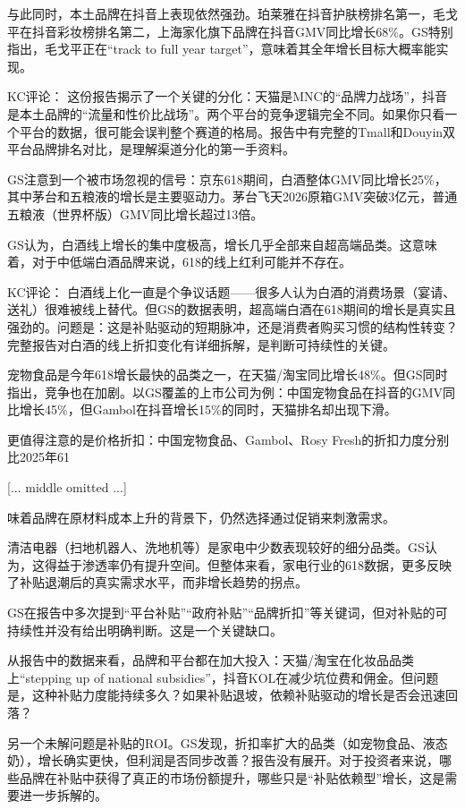 \documentclass[11pt]{ctexart}
\begin{document}
与此同时，本土品牌在抖音上表现依然强劲。珀莱雅在抖音护肤榜排名第一，毛戈平在抖音彩妆榜排名第二，上海家化旗下品牌在抖音GMV同比增长68\%。GS特别指出，毛戈平正在“track to full year target”，意味着其全年增长目标大概率能实现。

KC评论： 这份报告揭示了一个关键的分化：天猫是MNC的“品牌力战场”，抖音是本土品牌的“流量和性价比战场”。两个平台的竞争逻辑完全不同。如果你只看一个平台的数据，很可能会误判整个赛道的格局。报告中有完整的Tmall和Douyin双平台品牌排名对比，是理解渠道分化的第一手资料。

GS注意到一个被市场忽视的信号：京东618期间，白酒整体GMV同比增长25\%，其中茅台和五粮液的增长是主要驱动力。茅台飞天2026原箱GMV突破3亿元，普通五粮液（世界杯版）GMV同比增长超过13倍。

GS认为，白酒线上增长的集中度极高，增长几乎全部来自超高端品类。这意味着，对于中低端白酒品牌来说，618的线上红利可能并不存在。

KC评论： 白酒线上化一直是个争议话题——很多人认为白酒的消费场景（宴请、送礼）很难被线上替代。但GS的数据表明，超高端白酒在618期间的增长是真实且强劲的。问题是：这是补贴驱动的短期脉冲，还是消费者购买习惯的结构性转变？完整报告对白酒的线上折扣变化有详细拆解，是判断可持续性的关键。

宠物食品是今年618增长最快的品类之一，在天猫/淘宝同比增长48\%。但GS同时指出，竞争也在加剧。以GS覆盖的上市公司为例：中国宠物食品在抖音的GMV同比增长45\%，但Gambol在抖音增长15\%的同时，天猫排名却出现下滑。

更值得注意的是价格折扣：中国宠物食品、Gambol、Rosy Fresh的折扣力度分别比2025年61

[... middle omitted ...]

味着品牌在原材料成本上升的背景下，仍然选择通过促销来刺激需求。

清洁电器（扫地机器人、洗地机等）是家电中少数表现较好的细分品类。GS认为，这得益于渗透率仍有提升空间。但整体来看，家电行业的618数据，更多反映了补贴退潮后的真实需求水平，而非增长趋势的拐点。

GS在报告中多次提到“平台补贴”“政府补贴”“品牌折扣”等关键词，但对补贴的可持续性并没有给出明确判断。这是一个关键缺口。

从报告中的数据来看，品牌和平台都在加大投入：天猫/淘宝在化妆品品类上“stepping up of national subsidies”，抖音KOL在减少坑位费和佣金。但问题是，这种补贴力度能持续多久？如果补贴退坡，依赖补贴驱动的增长是否会迅速回落？

另一个未解问题是补贴的ROI。GS发现，折扣率扩大的品类（如宠物食品、液态奶），增长确实更快，但利润是否同步改善？报告没有展开。对于投资者来说，哪些品牌在补贴中获得了真正的市场份额提升，哪些只是“补贴依赖型”增长，这是需要进一步拆解的。
\end{document}
